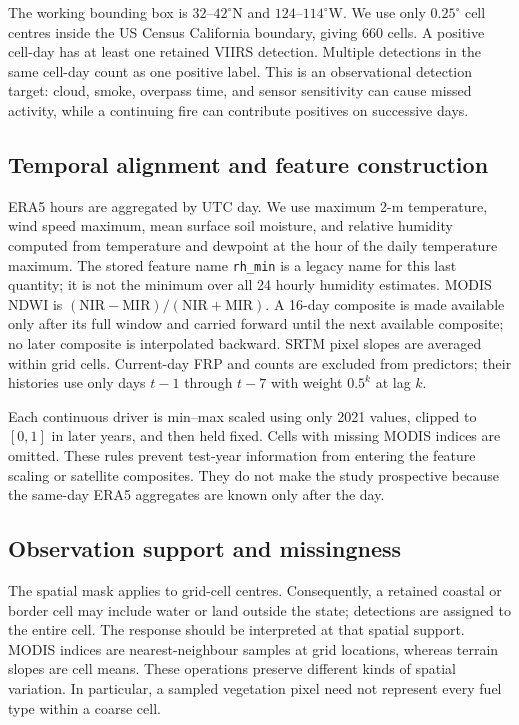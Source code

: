 \documentclass[conference]{IEEEtran}
\begin{document}
The working bounding box is $32$--$42^\circ$N and $124$--$114^\circ$W. We use only $0.25^\circ$ cell centres inside the US Census California boundary, giving 660 cells. A positive cell-day has at least one retained VIIRS detection. Multiple detections in the same cell-day count as one positive label. This is an observational detection target: cloud, smoke, overpass time, and sensor sensitivity can cause missed activity, while a continuing fire can contribute positives on successive days.

\subsection{Temporal alignment and feature construction}
ERA5 hours are aggregated by UTC day. We use maximum 2-m temperature, wind speed maximum, mean surface soil moisture, and relative humidity computed from temperature and dewpoint at the hour of the daily temperature maximum. The stored feature name \texttt{rh\_min} is a legacy name for this last quantity; it is not the minimum over all 24 hourly humidity estimates. MODIS NDWI is $(\mathrm{NIR}-\mathrm{MIR})/(\mathrm{NIR}+\mathrm{MIR})$. A 16-day composite is made available only after its full window and carried forward until the next available composite; no later composite is interpolated backward. SRTM pixel slopes are averaged within grid cells. Current-day FRP and counts are excluded from predictors; their histories use only days $t-1$ through $t-7$ with weight $0.5^k$ at lag $k$.

Each continuous driver is min--max scaled using only 2021 values, clipped to $[0,1]$ in later years, and then held fixed. Cells with missing MODIS indices are omitted. These rules prevent test-year information from entering the feature scaling or satellite composites. They do not make the study prospective because the same-day ERA5 aggregates are known only after the day.

\subsection{Observation support and missingness}
The spatial mask applies to grid-cell centres. Consequently, a retained coastal or border cell may include water or land outside the state; detections are assigned to the entire cell. The response should be interpreted at that spatial support. MODIS indices are nearest-neighbour samples at grid locations, whereas terrain slopes are cell means. These operations preserve different kinds of spatial variation. In particular, a sampled vegetation pixel need not represent every fuel type within a coarse cell.
\end{document}
